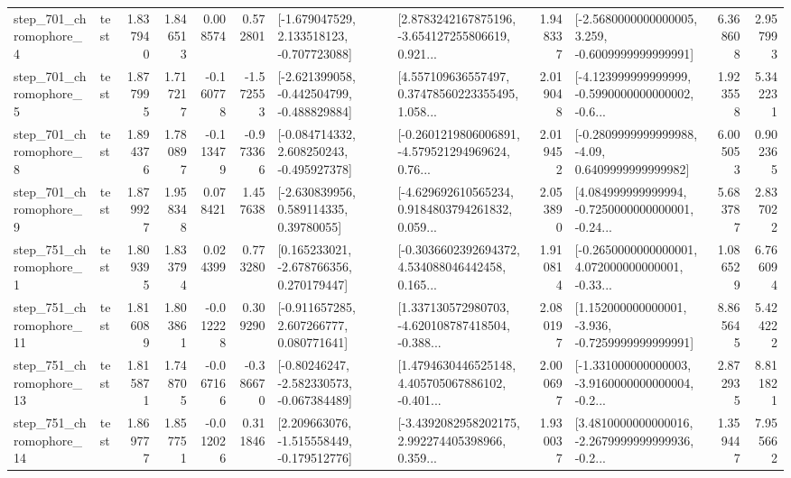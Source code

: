 \begin{tabular}{llrrrrllrlrr}
   step\_701\_chromophore\_4 &      test &      1.837940 &    1.846513 &      0.008574 &  0.572801 &   [-1.679047529, 2.133518123, -0.707723088] &  [2.8783242167875196, -3.654127255806619, 0.921... &       1.948337 &  [-2.5680000000000005, 3.259, -0.6009999999999991] &            6.368608 &          2.957993 \\
   step\_701\_chromophore\_5 &      test &      1.877995 &    1.717217 &     -0.160778 & -1.572553 &  [-2.621399058, -0.442504799, -0.488829884] &  [4.557109636557497, 0.37478560223355495, 1.058... &       2.019048 &  [-4.123999999999999, -0.5990000000000002, -0.6... &            1.923558 &          5.342231 \\
   step\_701\_chromophore\_8 &      test &      1.894376 &    1.780897 &     -0.113479 & -0.973366 &   [-0.084714332, 2.608250243, -0.495927378] &  [-0.2601219806006891, -4.579521294969624, 0.76... &       2.019452 &   [-0.2809999999999988, -4.09, 0.6409999999999982] &            6.005053 &          0.902365 \\
   step\_701\_chromophore\_9 &      test &      1.879927 &    1.958348 &      0.078421 &  1.457638 &     [-2.630839956, 0.589114335, 0.39780055] &  [-4.629692610565234, 0.9184803794261832, 0.059... &       2.053890 &  [4.084999999999994, -0.7250000000000001, -0.24... &            5.683787 &          2.837022 \\
   step\_751\_chromophore\_1 &      test &      1.809395 &    1.833794 &      0.024399 &  0.773280 &    [0.165233021, -2.678766356, 0.270179447] &  [-0.3036602392694372, 4.534088046442458, 0.165... &       1.910814 &  [-0.2650000000000001, 4.072000000000001, -0.33... &            1.086529 &          6.766094 \\
  step\_751\_chromophore\_11 &      test &      1.816089 &    1.803861 &     -0.012228 &  0.309290 &    [-0.911657285, 2.607266777, 0.080771641] &  [1.337130572980703, -4.620108787418504, -0.388... &       2.080197 &   [1.152000000000001, -3.936, -0.7259999999999991] &            8.865645 &          5.424222 \\
  step\_751\_chromophore\_13 &      test &      1.815871 &    1.748705 &     -0.067166 & -0.386670 &   [-0.80246247, -2.582330573, -0.067384489] &  [1.4794630446525148, 4.405705067886102, -0.401... &       2.000697 &  [-1.331000000000003, -3.9160000000000004, -0.2... &            2.872935 &          8.811821 \\
  step\_751\_chromophore\_14 &      test &      1.869777 &    1.857751 &     -0.012026 &  0.311846 &   [2.209663076, -1.515558449, -0.179512776] &  [-3.4392082958202175, 2.992274405398966, 0.359... &       1.930037 &  [3.4810000000000016, -2.2679999999999936, -0.2... &            1.359447 &          7.955662 \\

\end{tabular}
